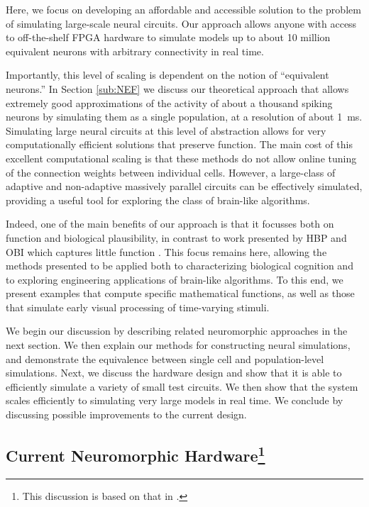 \documentclass[english]{article}
\begin{document}
Here, we focus on developing an affordable and accessible solution to the problem of simulating large-scale neural circuits.  Our approach allows anyone with access to off-the-shelf FPGA hardware to simulate models up to about 10 million equivalent neurons with arbitrary connectivity in real time.

Importantly, this level of scaling is dependent on the notion of ``equivalent neurons.'' In Section {\ref{sub:NEF}} we discuss our theoretical approach that allows extremely good approximations of the activity of about a thousand spiking neurons by simulating them as a single population, at a resolution of about 1~ms.  Simulating large neural circuits at this level of abstraction allows for very computationally efficient solutions that preserve function. The main cost of this excellent computational scaling is that these methods do not allow online tuning of the connection weights between individual cells.  However, a large-class of adaptive and non-adaptive massively parallel circuits can be effectively simulated, providing a useful tool for exploring the class of brain-like algorithms.

Indeed, one of the main benefits of our approach is that it focusses both on function and biological plausibility, in contrast to work presented by HBP and OBI  which captures little function \cite{eliasmith2013a}.  This focus remains here, allowing the methods presented to be applied both to characterizing biological cognition and to exploring engineering applications of brain-like algorithms. To this end, we present examples that compute specific mathematical functions, as well as those that simulate early visual processing of time-varying stimuli.

We begin our discussion by describing related neuromorphic approaches in the next section.  We then explain our methods for constructing neural simulations, and demonstrate the equivalence between single cell and population-level simulations.  Next, we discuss the hardware design and show that it is able to efficiently simulate a variety of small test circuits.  We then show that the system scales efficiently to simulating very large models in real time. We conclude by discussing possible improvements to the current design.


\subsection{\label{sub:neuromorphic}Current Neuromorphic Hardware\protect\footnote{This discussion is based on that in \cite{eliasmith2015a}.}}
\end{document}
